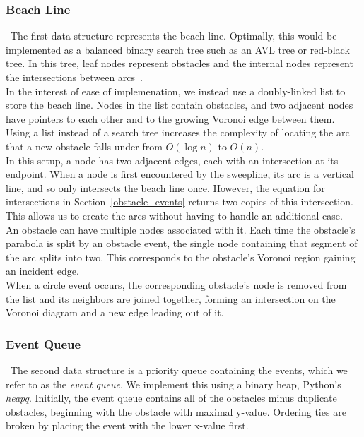 \documentclass[conference]{IEEEtran}
\begin{document}
\subsubsection{Beach Line}
\noindent\ The first data structure represents the beach line. Optimally,
this would be implemented as a balanced binary search tree such as an AVL tree or
red-black tree. In this tree, leaf nodes represent obstacles and
the internal nodes represent the intersections between arcs~\cite{mitslides}.\\
\indent In the interest of ease of implemenation, we instead use a
doubly-linked list to store the beach line. Nodes in the list contain
obstacles, and two adjacent nodes have pointers to each other and to the
growing Voronoi edge between them. Using a list instead of a search tree
increases the complexity of locating the arc that a new obstacle falls under
from $O(\log n)$ to $O(n)$.\\
\indent In this setup, a node has two adjacent edges, each with an intersection
at its endpoint. When a node is first encountered by the sweepline, its arc is a
vertical line, and so only intersects the beach line once. However, the equation
for intersections in Section~\ref{obstacle_events} returns two copies of this
intersection. This allows us to create the arcs without having to handle an
additional case.\\
\indent An obstacle can have multiple nodes associated with it. Each time the
obstacle's parabola is split by an obstacle event, the single node containing
that segment of the arc splits into two. This corresponds to the obstacle's
Voronoi region gaining an incident edge.\\
\indent When a circle event occurs, the corresponding obstacle's node is removed
from the list and its neighbors are joined together, forming an intersection on the
Voronoi diagram and a new edge leading out of it.

\subsubsection{Event Queue}
\noindent\ The second data structure is a priority queue containing the events, which we refer to as
the \emph{event queue}. We implement this using a binary heap, Python's \emph{heapq}.
Initially, the event queue contains all of the obstacles minus duplicate obstacles,
beginning with the obstacle with maximal y-value. Ordering ties are broken by
placing the event with the lower x-value first.
\end{document}
